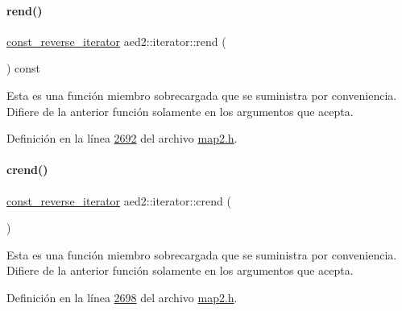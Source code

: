 \paragraph{\texorpdfstring{rend()}{rend()}\hspace{0.1cm}{\footnotesize\ttfamily [2/2]}}
{\footnotesize\ttfamily \hyperlink{classaed2_1_1iterator_a657402896e5b5966660032f5686cc4c4_a657402896e5b5966660032f5686cc4c4}{const\+\_\+reverse\+\_\+iterator} aed2\+::iterator\+::rend (\begin{DoxyParamCaption}{ }\end{DoxyParamCaption}) const\hspace{0.3cm}{\ttfamily [inline]}}

Esta es una función miembro sobrecargada que se suministra por conveniencia. Difiere de la anterior función solamente en los argumentos que acepta. 

Definición en la línea \hyperlink{map2_8h_source_l02692}{2692} del archivo \hyperlink{map2_8h_source}{map2.\+h}.

\mbox{\label{classaed2_1_1iterator_a2e31ad7ded06c666c6c37c5d30bb41af_a2e31ad7ded06c666c6c37c5d30bb41af}} 
\paragraph{\texorpdfstring{crend()}{crend()}}
{\footnotesize\ttfamily \hyperlink{classaed2_1_1iterator_a657402896e5b5966660032f5686cc4c4_a657402896e5b5966660032f5686cc4c4}{const\+\_\+reverse\+\_\+iterator} aed2\+::iterator\+::crend (\begin{DoxyParamCaption}{ }\end{DoxyParamCaption})\hspace{0.3cm}{\ttfamily [inline]}}

Esta es una función miembro sobrecargada que se suministra por conveniencia. Difiere de la anterior función solamente en los argumentos que acepta. 

Definición en la línea \hyperlink{map2_8h_source_l02698}{2698} del archivo \hyperlink{map2_8h_source}{map2.\+h}.

\mbox{\label{classaed2_1_1iterator_aa442801bed510f7fde94e14bafada8a1_aa442801bed510f7fde94e14bafada8a1}} 
